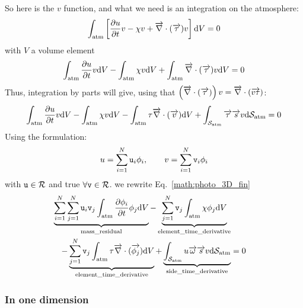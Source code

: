 So here is the $v$ function, and what we need is an integration on
the atmosphere:
\begin{equation}
\int_{\text{atm}}\left[\frac{\partial u}{\partial t}v - \chi v + \overrightarrow{\nabla}\cdot(\overrightarrow{\tau}) v\right] \mathrm{d} V = 0
\label{math:solve:3D_photo}
\end{equation}
with $V$ a volume element
\begin{equation}
  \int_{\text{atm}}\frac{\partial u}{\partial t}v\mathrm{d} V 
- \int_{\text{atm}}\chi v \mathrm{d} V 
+ \int_{\text{atm}}\overrightarrow{\nabla}\cdot(\overrightarrow{\tau})v \mathrm{d} V  = 0
\label{math:photo_3D_start}
\end{equation}
Thus, integration by parts will give,
using that $\left(\overrightarrow{\nabla}\cdot(\overrightarrow{\tau})\right) v = \overrightarrow{\nabla}\cdot(\overrightarrow{v\tau})$:
\begin{equation}
  \int_{\text{atm}}\frac{\partial u}{\partial t}v\mathrm{d} V
- \int_{\text{atm}}\chi v \mathrm{d} V 
- \int_{\text{atm}} \tau \overrightarrow{\nabla}\cdot(\overrightarrow{v}) \mathrm{d} V 
+ \int_{\mathcal{S}_\text{atm}} \overrightarrow{\tau}\overrightarrow{s}v {\mathrm{d}\mathcal{S}_\text{atm}} = 0
\label{math:photo_3D_fin}
\end{equation}
Using the formulation:
\begin{equation}
u = \sum_{i=1}^N \mathtt{u}_i \phi_i,\qquad v = \sum_{i=1}^N\mathtt{v}_i \phi_i
\end{equation}
with $\mathtt{u} \in \mathcal{R}$ and true $\forall \mathtt{v} \in \mathcal{R}$. 
we rewrite Eq.~\ref{math:photo_3D_fin}
\begin{equation}
\begin{split}
  \underbrace{\sum_{i=1}^N\sum_{j=1}^N\mathtt{u}_i\mathtt{v}_j\int_{\text{atm}}\frac{\partial\phi_i}{\partial t}\phi_j\mathrm{d} V}_{\text{mass\_residual}}
- \underbrace{\sum_{j=1}^N\mathtt{v}_j\int_{\text{atm}}\chi \phi_j \mathrm{d} V}_\text{element\_time\_derivative} \\
- \underbrace{\sum_{j=1}^N\mathtt{v}_j\int_{\text{atm}} \tau \overrightarrow{\nabla}\cdot(\overrightarrow{\phi_j}) \mathrm{d} V}_\text{element\_time\_derivative}
+ \underbrace{\int_{\mathcal{S}_\text{atm}} u\overrightarrow{\omega}\overrightarrow{s}v {\mathrm{d}\mathcal{S}_\text{atm}}}_\text{side\_time\_derivative} & = 0
\end{split}
\end{equation}

\subsubsection{In one dimension}

